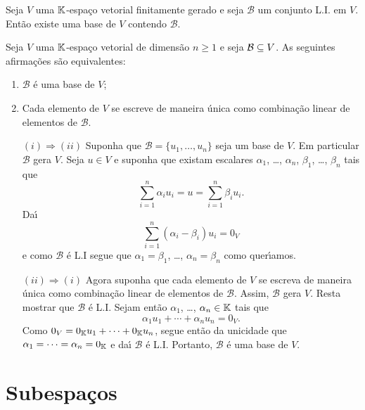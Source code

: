 \begin{teorema}\label{basecontendoconjuntoLI}
	Seja $V$ uma $\mathbb{K}$-espa\c{c}o vetorial finitamente gerado e seja $\mathcal{B}$ um conjunto L.I. em $V$. Ent\~ao existe uma base de $V$ contendo $\mathcal{B}$.
\end{teorema}

\begin{proposicao}
	Seja $V$ uma $\mathbb{K}$-espa\c{c}o vetorial de dimens\~ao $n \ge 1$ e seja $\mathcal{B} \subseteq V$. As seguintes afirma\c{c}\~oes s\~ao equivalentes:
	\begin{enumerate}[label=({\roman*})]
		\item $\mathcal{B}$ \'e uma base de $V$;
		\item Cada elemento de $V$ se escreve de maneira \'unica como combina\c{c}\~ao linear de elementos de $\mathcal{B}$.
	\end{enumerate}
\end{proposicao}
\begin{prova}
	\begin{itemize}
		\item[$(i) \Rightarrow (ii)$] Suponha que $\mathcal{B} = \{u_1, \dots,u_n\}$ seja um base de $V$. Em particular $\mathcal{B}$ gera $V$. Seja $u \in V$ e suponha que existam escalares $\alpha_1$, \dots, $\alpha_n$, $\beta_1$, \dots, $\beta_n$ tais que
		\[
			\sum_{i = 1}^n \alpha_iu_i = u = \sum_{i = 1}^n \beta_iu_i.
		\]
		Da{\'\i}
		\[
			\sum_{i = 1}^n (\alpha_i - \beta_i)u_i	 = 0_V
		\]
		e como $\mathcal{B}$ \'e L.I segue que $\alpha_1 = \beta_1$, \dots, $\alpha_n = \beta_n$ como quer{\'\i}amos.
		\item[$(ii) \Rightarrow (i)$] Agora suponha que cada elemento de $V$ se escreva de maneira \'unica como combina\c{c}\~ao linear de elementos de $\mathcal{B}$. Assim, $\mathcal{B}$ gera $V$. Resta mostrar que $\mathcal{B}$ \'e L.I. Sejam ent\~ao $\alpha_1$, \dots, $\alpha_n \in \mathbb{K}$ tais que
		\[
			\alpha_1u_1 + \cdots + \alpha_nu_n = 0_V.
		\]
		Como $0_V = 0_{\mathbb{K}}u_1 + \cdots + 0_{\mathbb{K}}u_n$, segue ent\~ao da unicidade que $\alpha_1 = \dots = \alpha_n = 0_{\mathbb{K}}$ e da{\'\i} $\mathcal{B}$ \'e L.I. Portanto, $\mathcal{B}$ \'e uma base de $V$.
	\end{itemize}
\end{prova}

\section{Subespa\c{c}os} %
\label{sec:subespacos}

